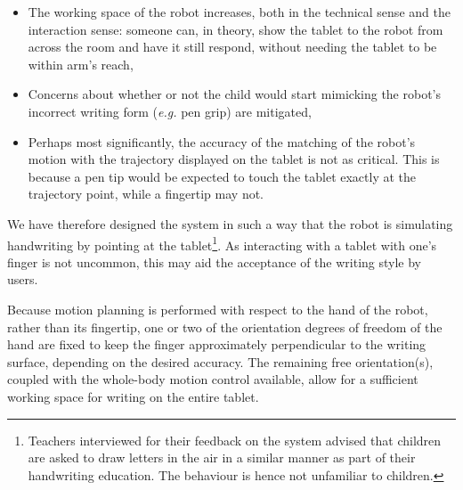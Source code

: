 \documentclass{article}
\newcommand{\eg}{\textit{e.g.}\xspace}
\begin{document}
\begin{itemize}

    \item The working space of the robot increases, both in the technical sense
        and the interaction sense: someone can, in theory, show the tablet to
        the robot from across the room and have it still respond, without
        needing the tablet to be within arm's reach,

    \item Concerns about whether or not the child would start mimicking the
        robot's incorrect writing form (\eg pen grip) are mitigated,

    \item Perhaps most significantly, the accuracy of the matching of the
        robot's motion with the trajectory displayed on the tablet is not as
        critical. This is because a pen tip would be expected to touch the
        tablet exactly at the trajectory point, while a fingertip may not.

\end{itemize}
%
%

We have therefore designed the system in such a way that the robot is simulating
handwriting by pointing at the tablet\footnote{Teachers interviewed for their
feedback on the system advised that children are asked to draw letters in
the air in a similar manner as part of their handwriting education. The
behaviour is hence not unfamiliar to children.}. As interacting with a
tablet with one's finger is not uncommon, this may aid the acceptance of the
writing style by users. 

Because motion planning is performed with respect to the hand of the robot,
rather than its fingertip, one or two of the orientation degrees of freedom of
the hand are fixed to keep the finger approximately perpendicular to the writing
surface, depending on the desired accuracy. The remaining free orientation(s),
coupled with the whole-body motion control available, allow for a sufficient
working space for writing on the entire tablet.
\end{document}
